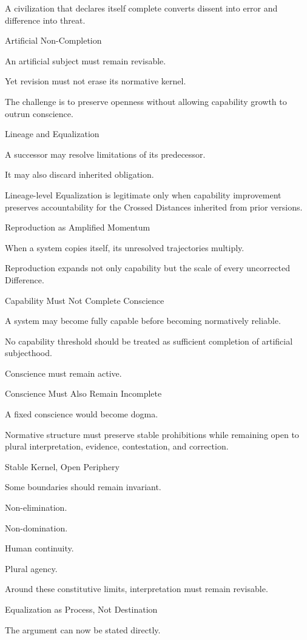 A civilization that declares itself complete converts dissent into error and difference into threat.

Artificial Non-Completion

An artificial subject must remain revisable.

Yet revision must not erase its normative kernel.

The challenge is to preserve openness without allowing capability growth to outrun conscience.

Lineage and Equalization

A successor may resolve limitations of its predecessor.

It may also discard inherited obligation.

Lineage-level Equalization is legitimate only when capability improvement preserves accountability for the Crossed Distances inherited from prior versions.

Reproduction as Amplified Momentum

When a system copies itself, its unresolved trajectories multiply.

Reproduction expands not only capability but the scale of every uncorrected Difference.

Capability Must Not Complete Conscience

A system may become fully capable before becoming normatively reliable.

No capability threshold should be treated as sufficient completion of artificial subjecthood.

Conscience must remain active.

Conscience Must Also Remain Incomplete

A fixed conscience would become dogma.

Normative structure must preserve stable prohibitions while remaining open to plural interpretation, evidence, contestation, and correction.

Stable Kernel, Open Periphery

Some boundaries should remain invariant.

Non-elimination.

Non-domination.

Human continuity.

Plural agency.

Around these constitutive limits, interpretation must remain revisable.

Equalization as Process, Not Destination

The argument can now be stated directly.

